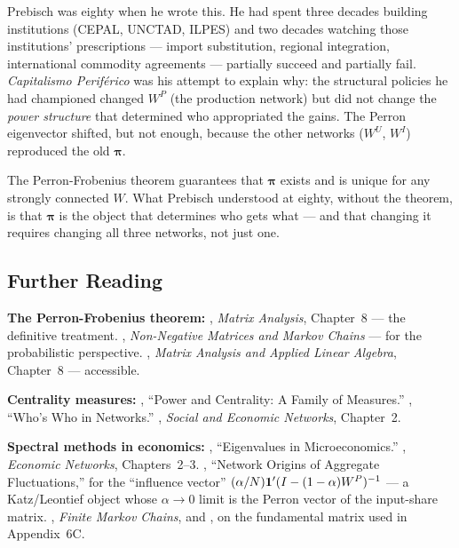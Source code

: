 \documentclass[../structural_economics_book.tex]{subfiles}
\begin{document}
Prebisch was eighty when he wrote this. He had spent three decades building institutions (CEPAL, UNCTAD, ILPES) and two decades watching those institutions' prescriptions --- import substitution, regional integration, international commodity agreements --- partially succeed and partially fail. \textit{Capitalismo Perif\'{e}rico} was his attempt to explain why: the structural policies he had championed changed $W^P$ (the production network) but did not change the \textit{power structure} that determined who appropriated the gains. The Perron eigenvector shifted, but not enough, because the other networks ($W^U$, $W^I$) reproduced the old $\boldsymbol{\pi}$.

The Perron-Frobenius theorem guarantees that $\boldsymbol{\pi}$ exists and is unique for any strongly connected $W$. What Prebisch understood at eighty, without the theorem, is that $\boldsymbol{\pi}$ is the object that determines who gets what --- and that changing it requires changing all three networks, not just one.


\subsection*{Further Reading}

\textbf{The Perron-Frobenius theorem:} \citet{horn2012matrix}, \textit{Matrix Analysis}, Chapter~8 --- the definitive treatment. \citet{seneta2006nonnegative}, \textit{Non-Negative Matrices and Markov Chains} --- for the probabilistic perspective. \citet{meyer2000matrix}, \textit{Matrix Analysis and Applied Linear Algebra}, Chapter~8 --- accessible.

\textbf{Centrality measures:} \citet{bonacich1987power}, ``Power and Centrality: A Family of Measures.'' \citet{ballester2006whos}, ``Who's Who in Networks.'' \citet{jackson2008social}, \textit{Social and Economic Networks}, Chapter~2.

\textbf{Spectral methods in economics:} \citet{golub2025eigenvalues}, ``Eigenvalues in Microeconomics.'' \citet{sargent2024economic}, \textit{Economic Networks}, Chapters~2--3. \citet{acemoglu2012network}, ``Network Origins of Aggregate Fluctuations,'' for the ``influence vector'' $(\alpha/N)\mathbf{1}'(I - (1-\alpha)W^P)^{-1}$ --- a Katz/Leontief object whose $\alpha \to 0$ limit is the Perron vector of the input-share matrix. \citet{kemeny1960finite}, \textit{Finite Markov Chains}, and \citet{meyer1980condition}, on the fundamental matrix used in Appendix~6C.
\end{document}
